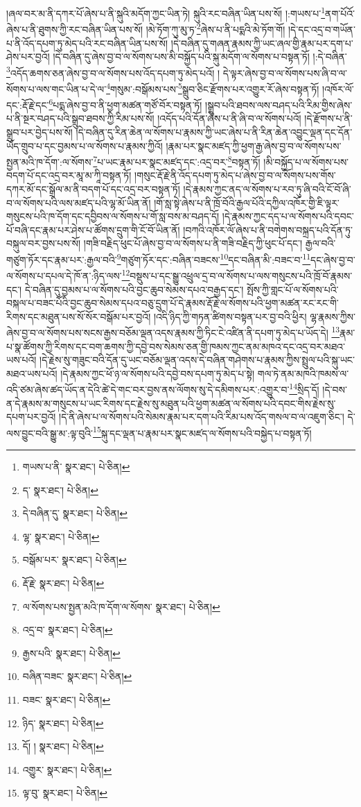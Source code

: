 །ཞལ་བར་མ་ནི་དཀར་པོ་ཞེས་པ་ནི་སྐུའི་མདོག་ཀྱང་ཡིན་ཏེ། སྐུའི་རང་བཞིན་ཡིན་པས་སོ། །:གཡས་པ་\footnote{གཡས་པ་ནི་  སྣར་ཐང་།  པེ་ཅིན། }ནག་པོའོ་ཞེས་པ་ནི་ཐུགས་ཀྱི་རང་བཞིན་ཡིན་པས་སོ། །མེ་ཏོག་ཀུ་མུ་ཏ་\footnote{ད་  སྣར་ཐང་།  པེ་ཅིན། }ཞེས་པ་ནི་པདྨའི་མེ་ཏོག་གོ། །དེ་དང་འདྲ་བ་གཡོན་པ་ནི་འོད་དཔག་ཏུ་མེད་པའི་རང་བཞིན་ཡིན་པས་སོ། །དེ་བཞིན་དུ་གཞན་རྣམས་ཀྱི་ཡང་ཞལ་གྱི་རྣམ་པར་དག་པ་ཤེས་པར་བྱའོ། །དེ་བཞིན་དུ་ཞེས་བྱ་བ་ལ་སོགས་པས་མི་བསྐྱོད་པའི་སྐུ་མདོག་ལ་སོགས་པ་བསྟན་ཏོ། །:དེ་བཞིན་\footnote{དེ་བཞིན་དུ་  སྣར་ཐང་།  པེ་ཅིན། }འདོད་ཆགས་ཅན་ཞེས་བྱ་བ་ལ་སོགས་པས་འོད་དཔག་ཏུ་མེད་པའོ། །
དེ་ལྟར་ཞེས་བྱ་བ་ལ་སོགས་པས་ཞི་བ་ལ་སོགས་པ་ལས་གང་ཡིན་པ་དེ་ལ་\footnote{ལྷ་  སྣར་ཐང་།  པེ་ཅིན། }གསུམ་:བསྒོམས་པས་\footnote{བསྒོམ་པར་  སྣར་ཐང་།  པེ་ཅིན། }སྒྲུབ་ཅིང་རྫོགས་པར་འགྱུར་རོ་ཞེས་བསྟན་ཏོ། །འཁོར་ལོ་དང་:རྡོ་རྗེ་དང་\footnote{རྡོ་རྗེ་  སྣར་ཐང་།  པེ་ཅིན། }པདྨ་ཞེས་བྱ་བ་ནི་ཕྱག་མཚན་གཙོ་བོར་བསྟན་ཏོ། །སྒྲུབ་པའི་ཐབས་ལས་བཤད་པའི་རིམ་གྱིས་ཞེས་པ་ནི་སྔར་བཤད་པའི་སྒྲུབ་ཐབས་ཀྱི་རིམ་པས་སོ། །འདོད་པའི་དོན་ཞེས་པ་ནི་ཞི་བ་ལ་སོགས་པའོ། །དེ་རྫོགས་པ་ནི་སྒྲུབ་པར་བྱེད་པས་སོ། །དེ་བཞིན་དུ་རིན་ཆེན་ལ་སོགས་པ་རྣམས་ཀྱི་ཡང་ཞེས་པ་ནི་རིན་ཆེན་འབྱུང་ལྡན་དང་དོན་ཡོད་གྲུབ་པ་དང་བྱམས་པ་ལ་སོགས་པ་རྣམས་ཀྱིའོ། །རྣམ་པར་སྣང་མཛད་ཀྱི་ཕྱག་རྒྱ་ཞེས་བྱ་བ་ལ་སོགས་པས་སྤྱན་མའི་ཁ་དོག་:ལ་སོགས་\footnote{ལ་སོགས་པས་སྤྱན་མའི་ཁ་དོག་ལ་སོགས་  སྣར་ཐང་།  པེ་ཅིན། }པ་ཡང་རྣམ་པར་སྣང་མཛད་དང་:འདྲ་བར་\footnote{འདྲ་བ་  སྣར་ཐང་།  པེ་ཅིན། }བསྟན་ཏོ། །མི་བསྐྱོད་པ་ལ་སོགས་པས་བདག་པོ་དང་འདྲ་བར་མཱ་མ་ཀཱི་བསྟན་ཏོ། །གསུང་རྡོ་རྗེ་ནི་འོད་དཔག་ཏུ་མེད་པ་ཞེས་བྱ་བ་ལ་སོགས་པས་གོས་དཀར་མོ་དང་སྒྲོལ་མ་ནི་བདག་པོ་དང་འདྲ་བར་བསྟན་ཏོ། །དེ་རྣམས་ཀྱང་ནད་ལ་སོགས་པ་རབ་ཏུ་ཞི་བའི་ངོ་བོ་ཞི་བ་ལ་སོགས་པའི་ལས་མཛད་པའི་ལྷ་མོ་ཡིན་ནོ། །གོ་སླ་སྟེ་ཞེས་པ་ནི་ཁྲོ་བོའི་རྒྱལ་པོའི་དཀྱིལ་འཁོར་གྱི་ཇི་ལྟར་གསུངས་པའི་ཁ་དོག་དང་དབྱིབས་ལ་སོགས་པ་གོ་སླ་བས་མ་བཤད་དོ། །དེ་རྣམས་ཀྱང་དད་པ་ལ་སོགས་པའི་དབང་པོ་བཞི་དང་རྣམ་པར་ཤེས་པ་ཚོགས་དྲུག་གི་ངོ་བོ་ཡིན་ནོ། །བཀའི་འཁོར་ལོ་ཞེས་པ་ནི་བགེགས་བསྐྲད་པའི་དོན་ཏུ་བསྐུལ་བར་བྱས་པས་སོ། །གཟི་བརྗིད་ཕུང་པོ་ཞེས་བྱ་བ་ལ་སོགས་པ་ནི་གཟི་བརྗིད་ཀྱི་ཕུང་པོ་དང་། རྒྱལ་བའི་གཙུག་ཏོར་དང་རྣམ་པར་:རྒྱལ་བའི་\footnote{རྒྱས་པའི་  སྣར་ཐང་།  པེ་ཅིན། }གཙུག་ཏོར་དང་:བཞིན་བཟངས་\footnote{བཞིན་བཟང་  སྣར་ཐང་།  པེ་ཅིན། }དང་བཞིན་མི་:བཟང་བ་\footnote{བཟང་  སྣར་ཐང་།  པེ་ཅིན། }དང་ཞེས་བྱ་བ་ལ་སོགས་པ་དཔལ་དེ་ཁོ་ན་:ཉིད་ལས་\footnote{ཉིད་  སྣར་ཐང་།  པེ་ཅིན། }བསྡུས་པ་དང་སྒྱུ་འཕྲུལ་དྲ་བ་ལ་སོགས་པ་ལས་གསུངས་པའི་ཁྲོ་བོ་རྣམས་དང་། དེ་བཞིན་དུ་བྱམས་པ་ལ་སོགས་པའི་བྱང་ཆུབ་སེམས་དཔའ་བརྒྱད་དང་། སྤོས་ཀྱི་གླང་པོ་ལ་སོགས་པའི་བསྐལ་པ་བཟང་པོའི་བྱང་ཆུབ་སེམས་དཔའ་བཅུ་དྲུག་པོ་དེ་རྣམས་རྡོ་རྗེ་ལ་སོགས་པའི་ཕྱག་མཚན་རང་རང་གི་རིགས་དང་མཐུན་པས་སོ་སོར་བསྒོམ་པར་བྱའོ། །འདི་ཉིད་ཀྱི་གཏན་ཚིགས་བསྟན་པར་བྱ་བའི་ཕྱིར། ལྷ་རྣམས་ཀྱིས་ཞེས་བྱ་བ་ལ་སོགས་པས་སངས་རྒྱས་བཅོམ་ལྡན་འདས་རྣམས་ཀྱི་ཏིང་ངེ་འཛིན་ནི་དཔག་ཏུ་མེད་པ་ཡོད་དེ། \footnote{དོ། །   སྣར་ཐང་།  པེ་ཅིན། }རྣམ་པ་སྣ་ཚོགས་ཀྱི་རིགས་དང་བག་ཆགས་ཀྱི་དབྱེ་བས་སེམས་ཅན་གྱི་ཁམས་ཀྱང་ནམ་མཁའ་དང་འདྲ་བར་མཐའ་ཡས་པའོ། །དེ་རྗེས་སུ་གཟུང་བའི་དོན་དུ་ཡང་བཅོམ་ལྡན་འདས་དེ་བཞིན་གཤེགས་པ་རྣམས་ཀྱིས་སྤྲུལ་པའི་སྐུ་ཡང་མཐའ་ཡས་པའོ། །དེ་རྣམས་ཀྱང་ཕོ་ཉ་ལ་སོགས་པའི་དབྱེ་བས་དཔག་ཏུ་མེད་པ་སྟེ། གལ་ཏེ་ནམ་མཁའི་ཁམས་ལ་འདི་ཙམ་ཞེས་ཚད་ཡོད་ན་དེའི་ཚེ་དེ་གང་བར་བྱས་ནས་ལོགས་སུ་དེ་དམིགས་པར་:འགྱུར་བ་\footnote{འགྱུར་  སྣར་ཐང་།  པེ་ཅིན། }སྲིད་དོ། །དེ་བས་ན་དེ་རྣམས་མ་གསུངས་པ་ཡང་རིགས་དང་རྗེས་སུ་མཐུན་པའི་ཕྱག་མཚན་ལ་སོགས་པའི་དབང་གིས་རྗེས་སུ་དཔག་པར་བྱའོ། །དེ་ནི་ཞེས་པ་ལ་སོགས་པའི་སེམས་རྣམ་པར་དག་པའི་རིམ་པས་འོད་གསལ་བ་ལ་འཇུག་ཅིང་། དེ་ལས་བྱུང་བའི་སྒྱུ་མ་:ལྟ་བུའི་\footnote{ལྟ་བུ་  སྣར་ཐང་།  པེ་ཅིན། }སྐུ་དང་ལྡན་པ་རྣམ་པར་སྣང་མཛད་ལ་སོགས་པའི་བསྐྱེད་པ་བསྟན་ཏོ། 